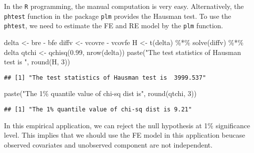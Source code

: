 \documentclass[
  12pt,
]{article}
\newenvironment{Shaded}{\begin{snugshade}}{\end{snugshade}}
\newcommand{\DecValTok}[1]{\textcolor[rgb]{0.00,0.00,0.81}{#1}}
\newcommand{\FloatTok}[1]{\textcolor[rgb]{0.00,0.00,0.81}{#1}}
\newcommand{\FunctionTok}[1]{\textcolor[rgb]{0.00,0.00,0.00}{#1}}
\newcommand{\NormalTok}[1]{#1}
\newcommand{\OtherTok}[1]{\textcolor[rgb]{0.56,0.35,0.01}{#1}}
\newcommand{\SpecialCharTok}[1]{\textcolor[rgb]{0.00,0.00,0.00}{#1}}
\newcommand{\StringTok}[1]{\textcolor[rgb]{0.31,0.60,0.02}{#1}}
\begin{document}
In the \texttt{R} programming, the manual computation is very easy.
Alternatively, the \texttt{phtest} function in the package \texttt{plm}
provides the Hausman test. To use the \texttt{phtest}, we need to
estimate the FE and RE model by the \texttt{plm} function.

\begin{Shaded}
\begin{Highlighting}[]
\NormalTok{delta }\OtherTok{\textless{}{-}}\NormalTok{ bre }\SpecialCharTok{{-}}\NormalTok{ bfe}
\NormalTok{diffv }\OtherTok{\textless{}{-}}\NormalTok{ vcovre }\SpecialCharTok{{-}}\NormalTok{ vcovfe}
\NormalTok{H }\OtherTok{\textless{}{-}} \FunctionTok{t}\NormalTok{(delta) }\SpecialCharTok{\%*\%} \FunctionTok{solve}\NormalTok{(diffv) }\SpecialCharTok{\%*\%}\NormalTok{ delta}
\NormalTok{qtchi }\OtherTok{\textless{}{-}} \FunctionTok{qchisq}\NormalTok{(}\FloatTok{0.99}\NormalTok{, }\FunctionTok{nrow}\NormalTok{(delta))}
\FunctionTok{paste}\NormalTok{(}\StringTok{"The test statistics of Hausman test is "}\NormalTok{, }\FunctionTok{round}\NormalTok{(H, }\DecValTok{3}\NormalTok{))}
\end{Highlighting}
\end{Shaded}

\begin{verbatim}
## [1] "The test statistics of Hausman test is  3999.537"
\end{verbatim}

\begin{Shaded}
\begin{Highlighting}[]
\FunctionTok{paste}\NormalTok{(}\StringTok{"The 1\% quantile value of chi{-}sq dist is"}\NormalTok{, }\FunctionTok{round}\NormalTok{(qtchi, }\DecValTok{3}\NormalTok{))}
\end{Highlighting}
\end{Shaded}

\begin{verbatim}
## [1] "The 1% quantile value of chi-sq dist is 9.21"
\end{verbatim}

In this empirical application, we can reject the null hypothesis at 1\%
significance level. This implies that we should use the FE model in this
application beucase observed covariates and unobserved component are not
independent.
\end{document}
